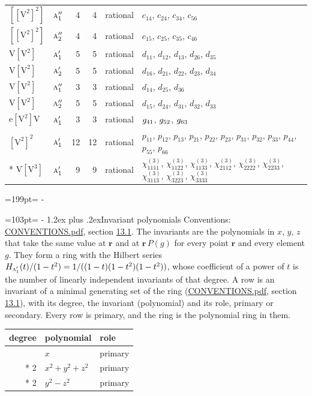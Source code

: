 \documentclass[10pt,a4paper]{article}
\makeatletter
\renewcommand\section{\@startsection{section}{1}{\z@}{-3ex plus -1ex minus -.2ex}%
  {1.2ex plus .2ex}{\normalfont\large\sffamily\bfseries\color{parttitle}}}
\newcommand{\needspace}[1]{\par\penalty-100\begingroup\dimen0=#1\relax\dimen2=\pagegoal
  \advance\dimen2-\pagetotal\ifdim\dimen0>\dimen2\relax\ifdim\dimen2>0pt\vfil\break\fi\fi
  \endgroup}
\numberwithin{equation}{section}
\newcommand{\irr}[1]{\text{\normalfont\scshape #1}}
\newcommand{\pointr}{\mathbf{r}}
\newcommand{\jahn}[1]{\mathrm{#1}}
\newlength{\fillwidth}\newlength{\cellwidth}\newlength{\colwidth}
\makeatother
\begin{document}
{\begin{longtable}{@{}llrrl>{\RaggedRight\arraybackslash}p{\fillwidth}@{}}
$\jahn{[[V^{2}]^{2}]}$ & $\irr{a}_{1}''$ & 4 & 4 & rational & $c_{14}$, $c_{24}$, $c_{34}$, $c_{56}$\\
$\jahn{[[V^{2}]^{2}]}$ & $\irr{a}_{2}''$ & 4 & 4 & rational & $c_{15}$, $c_{25}$, $c_{35}$, $c_{46}$\\
$\jahn{V[V^{2}]}$ & $\irr{a}_{1}'$ & 5 & 5 & rational & $d_{11}$, $d_{12}$, $d_{13}$, $d_{26}$, $d_{35}$\\
$\jahn{V[V^{2}]}$ & $\irr{a}_{2}'$ & 5 & 5 & rational & $d_{16}$, $d_{21}$, $d_{22}$, $d_{23}$, $d_{34}$\\
$\jahn{V[V^{2}]}$ & $\irr{a}_{1}''$ & 3 & 3 & rational & $d_{14}$, $d_{25}$, $d_{36}$\\
$\jahn{V[V^{2}]}$ & $\irr{a}_{2}''$ & 5 & 5 & rational & $d_{15}$, $d_{24}$, $d_{31}$, $d_{32}$, $d_{33}$\\
$\jahn{e[V^{2}]V}$ & $\irr{a}_{1}'$ & 3 & 3 & rational & $\mathnormal{g}_{41}$, $\mathnormal{g}_{52}$, $\mathnormal{g}_{63}$\\
$\jahn{[V^{2}]^{2}}$ & $\irr{a}_{1}'$ & 12 & 12 & rational & $p_{11}$, $p_{12}$, $p_{13}$, $p_{21}$, $p_{22}$, $p_{23}$, $p_{31}$, $p_{32}$, $p_{33}$, $p_{44}$, $p_{55}$, $p_{66}$\\*
$\jahn{V[V^{3}]}$ & $\irr{a}_{1}'$ & 9 & 9 & rational & $\chi^{(3)}_{1111}$, $\chi^{(3)}_{1122}$, $\chi^{(3)}_{1133}$, $\chi^{(3)}_{2112}$, $\chi^{(3)}_{2222}$, $\chi^{(3)}_{2233}$, $\chi^{(3)}_{3113}$, $\chi^{(3)}_{3223}$, $\chi^{(3)}_{3333}$\\
\bottomrule\end{longtable}}
\needspace{199pt}
\needspace{103pt}
\section{Invariant polynomials}\label{s:invariant_polynomials}
Conventions: \href{../../CONVENTIONS.pdf}{CONVENTIONS.pdf}, section \href{../../CONVENTIONS.pdf\#conv.13.1}{13.1}.
The invariants are the polynomials in $x$, $y$, $z$ that take the same value at $\pointr$ and at $\pointr\,P(g)$ for every point $\pointr$ and every element $g$. They form a ring with the Hilbert series $H_{\irr{a}_{1}'}(t)/(1-t^{2}) = 1/((1-t)(1-t^{2})(1-t^{2}))$, whose coefficient of a power of $t$ is the number of linearly independent invariants of that degree. \label{n:head.degree}\label{n:head.role}A row is an invariant of a minimal generating set of the ring (\href{../../CONVENTIONS.pdf}{CONVENTIONS.pdf}, section \href{../../CONVENTIONS.pdf\#conv.13.1}{13.1}), with its degree, the invariant (polynomial) and its role, primary or secondary. Every row is primary, and the ring is the polynomial ring in them.
{\small\begin{longtable}{@{}rll@{}}\toprule
degree & polynomial & role\\\midrule\endhead
\bottomrule\endfoot\endlastfoot
1 & $x$ & primary\\*
2 & $x^{2} + y^{2} + z^{2}$ & primary\\*
2 & $y^{2} - z^{2}$ & primary\\
\bottomrule\end{longtable}}
\end{document}
